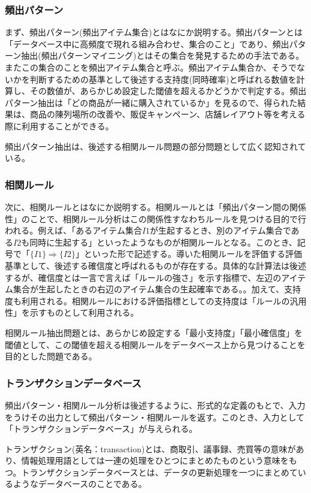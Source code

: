 \documentclass[dvipdfmx]{jsarticle}
\begin{document}
\subsubsection{頻出パターン}
まず、頻出パターン(頻出アイテム集合)とはなにか説明する。頻出パターンとは「データベース中に高頻度で現れる組み合わせ、集合のこと」であり、頻出パターン抽出(頻出パターンマイニング)とはその集合を発見するための手法である。またこの集合のことを頻出アイテム集合と呼ぶ。頻出アイテム集合か、そうでないかを判断するための基準として後述する支持度(同時確率)と呼ばれる数値を計算し、その数値が、あらかじめ設定した閾値を超えるかどうかで判定する。頻出パターン抽出は「どの商品が一緒に購入されているか」を見るので、得られた結果は、商品の陳列場所の改善や、販促キャンペーン、店舗レイアウト等を考える際に利用することができる。\par
頻出パターン抽出は、後述する相関ルール問題の部分問題として広く認知されている。
\subsubsection{相関ルール}
次に、相関ルールとはなにか説明する。相関ルールとは「頻出パターン間の関係性」のことで、相関ルール分析はこの関係性すなわちルールを見つける目的で行われる。例えば、「あるアイテム集合$I1$が生起するとき、別のアイテム集合である$I2$も同時に生起する」といったようなものが相関ルールとなる。このとき、記号で「$\{I1\} \Rightarrow \{I2\}$」といった形で記述する。導いた相関ルールを評価する評価基準として、後述する確信度と呼ばれるものが存在する。具体的な計算法は後述するが、確信度とは一言で言えば「ルールの強さ」を示す指標で、左辺のアイテム集合が生起したときの右辺のアイテム集合の生起確率である。。加えて、支持度も利用される。相関ルールにおける評価指標としての支持度は「ルールの汎用性」を示すものとして利用される。\par
相関ルール抽出問題とは、あらかじめ設定する「最小支持度」「最小確信度」を閾値として、この閾値を超える相関ルールをデータベース上から見つけることを目的とした問題である。
\subsubsection{トランザクションデータベース}
頻出パターン・相関ルール分析は後述するように、形式的な定義のもとで、入力をうけその出力として頻出パターン・相関ルールを返す。このとき、入力として「トランザクションデータベース」が与えられる。\par
トランザクション(英名：transaction)とは、商取引、議事録、売買等の意味があり、情報処理用語としては一連の処理をひとつにまとめたものという意味をもつ。トランザクションデータベースとは、データの更新処理を一つにまとめているようなデータベースのことである。
\end{document}
